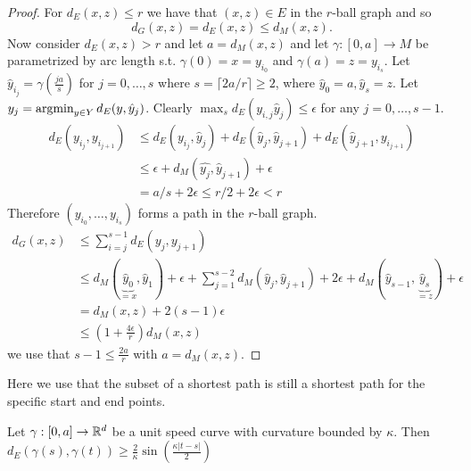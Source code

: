 \begin{proof}
    For $d_E(x,z)\leq r$ we have that $(x,z)\in E$ in the $r$-ball graph and so 
    \[d_G(x,z)=d_E(x,z)\leq d_M(x,z).\]
    Now consider $d_E(x,z)>r$ and let $a=d_M(x,z)$ and let $\gamma:[0,a]\to M$ be parametrized by 
    arc length s.t. $\gamma(0)=x=y_{i_0}$ and $\gamma(a)=z=y_{i_s}$. Let $\hat{y}_{i_j}=\gamma\left(\frac{j a}{s}\right)$
    for $j=0,\dots,s$ where $s=\lceil 2a/r\rceil\geq 2$, where $\hat{y}_0=a,\hat{y}_s=z$.
    Let $y_j=\operatorname*{\text{argmin}}_{y\in Y} d_E(y,\hat{y}_j)$. Clearly $\max_s d_E(y_{i,j}\hat{y}_j)\leq \epsilon$ for any $j=0,\dots,s-1$.
    \begin{align*}
        d_E(y_{i_j}, y_{i_{j+1}})&\leq d_E(y_{i_j},\hat{y}_j)+d_E(\hat{y}_j,\hat{y}_{j+1})+d_E(\hat{y}_{j+1},y_{i_{j+1}})\\
        &\leq \epsilon +d_M(\hat{y_j},\hat{y}_{j+1})+\epsilon\\
        &=a/s + 2\epsilon\leq r/2 + 2\epsilon< r
    \end{align*}
    Therefore $(y_{i_0},\dots,y_{i_s})$ forms a path in the $r$-ball graph.
    \begin{align*}
        d_G(x,z)&\leq \sum_{i=j}^{s-1} d_E(y_j,y_{j+1})\\
        &\leq d_M(\underbrace{\hat{y}_0}_{=x},\hat{y}_1)+\epsilon + \sum_{j=1}^{s-2} d_M(\hat{y}_j,\hat{y}_{j+1})+2\epsilon+d_M(\hat{y}_{s-1},\underbrace{\hat{y}_s}_{=z})+\epsilon\\
        &=d_M(x,z)+2(s-1)\epsilon\\
        &\leq \left(1+\frac{4\epsilon}{r}\right)d_M(x,z)
    \end{align*}
    we use that $s-1\leq \frac{2a}{r}$ with $a=d_M(x,z)$.
\end{proof}

\begin{aremark}
    Here we use that the subset of a shortest path is still a shortest path for the specific start and end points.
\end{aremark}

\begin{lemma}\label{lem:2.13}
    Let $\gamma:[0,a]\to\mathbb{R}^d$ be a unit speed curve with curvature bounded by $\kappa$. Then $d_E(\gamma(s),\gamma(t))\geq \frac{2}{\kappa}\sin\left(\frac{\kappa|t-s|}{2}\right)$
\end{lemma}

